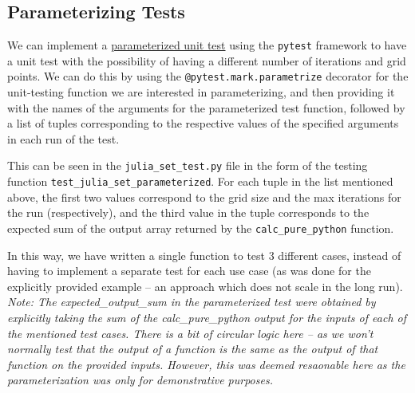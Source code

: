 \documentclass[a4paper,12pt]{article}
\begin{document}
\subsection{Parameterizing Tests}
We can implement a \underline{parameterized unit test} using the \verb|pytest| framework to have a unit test with the possibility of having a different number of iterations and grid points. We can do this by using the \verb|@pytest.mark.parametrize| decorator for the unit-testing function we are interested in parameterizing, and then providing it with the names of the arguments for the parameterized test function, followed by a list of tuples corresponding to the respective values of the specified arguments in each run of the test. 

This can be seen in the \verb|julia_set_test.py| file in the form of the testing function \verb|test_julia_set_parameterized|. For each tuple in the list mentioned above, the first two values correspond to the grid size and the max iterations for the run (respectively), and the third value in the tuple corresponds to the expected sum of the output array returned by the \verb|calc_pure_python| function. 

In this way, we have written a single function to test 3 different cases, instead of having to implement a separate test for each use case (as was done for the explicitly provided example -- an approach which does not scale in the long run).  \\
\textit{Note: The expected\_output\_sum in the parameterized test were obtained by explicitly taking the sum of the calc\_pure\_python output for the inputs of each of the mentioned test cases. There is a bit of circular logic here -- as we won't normally test that the output of a function is the same as the output of that function on the provided inputs. However, this was deemed resaonable here as the parameterization was only for demonstrative purposes.}
\end{document}
